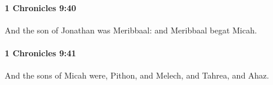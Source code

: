 		\paragraph{1 Chronicles 9:40} %
			\label{1CHRONICLES-9-40}

			And the son of Jonathan was Meribbaal: and Meribbaal begat Micah.


		\paragraph{1 Chronicles 9:41} %
			\label{1CHRONICLES-9-41}

			And the sons of Micah were, Pithon, and Melech, and Tahrea, and Ahaz.


